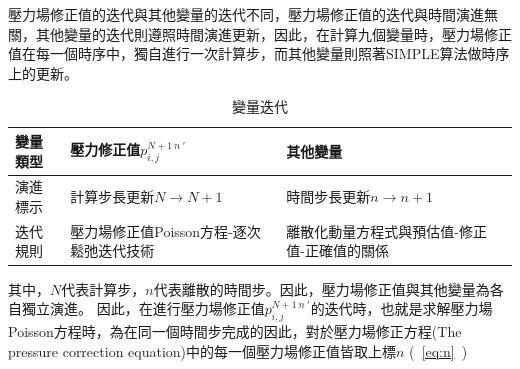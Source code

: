 \documentclass[12pt]{article}
\begin{document}
壓力場修正值的迭代與其他變量的迭代不同，壓力場修正值的迭代與時間演進無關，其他變量的迭代則遵照時間演進更新，因此，在計算九個變量時，壓力場修正值在每一個時序中，獨自進行一次計算步，而其他變量則照著SIMPLE算法做時序上的更新。\\
\begin{table}[H]
\centering
\caption{變量迭代}
\renewcommand{\arraystretch}{2.0}
\begin{tabular}{|>{\centering\arraybackslash}m{3cm}|>{\centering\arraybackslash}m{5cm}|>{\centering\arraybackslash}m{5cm}|}
\hline
\textbf{變量類型} & \textbf{壓力修正值}$p_{i,j}^{N+1\ n\ \prime}$ & \textbf{其他變量} \\
\hline
演進標示 & 計算步長更新$N \rightarrow N+1$ & 時間步長更新$n \rightarrow n+1$\\
\hline
迭代規則 &壓力場修正值Poisson方程-逐次鬆弛迭代技術 & 離散化動量方程式與預估值-修正值-正確值的關係 \\
\hline
\end{tabular}
\renewcommand{\arraystretch}{1.0}
\end{table}
\noindent 其中，$N$代表計算步，$n$代表離散的時間步。因此，壓力場修正值與其他變量為各自獨立演進。
因此，在進行壓力場修正值$p_{i,j}^{N+1\ n\ \prime}$的迭代時，也就是求解壓力場Poisson方程時，為在同一個時間步完成的因此，對於壓力場修正方程(The pressure correction equation)中的每一個壓力場修正值皆取上標$n$ (\ \ref{eq:n}\ )
\end{document}
